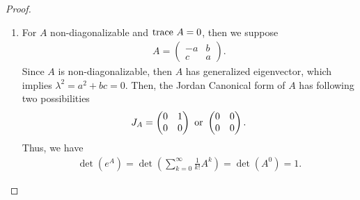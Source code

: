 \documentclass[11pt]{article}
\theoremstyle{definition}
\numberwithin{equation}{subsection}
\begin{document}
\begin{proof}
\begin{enumerate}[label=(\alph*)]
\begin{enumerate}[label = \arabic*)]
        \item For $A$ non-diagonalizable and ${\rm trace}\,\, A = 0$, then we suppose 
        \begin{align*}
            A = \begin{pmatrix}
                - a &  b \\
                c   &  a
            \end{pmatrix}. 
        \end{align*}
        Since $A$ is non-diagonalizable, then $A$ has generalized eigenvector, which implies $\lambda^2 = a^2 + bc = 0$. Then, the Jordan Canonical form of $A$ has following two possibilities
        \begin{align*}
            J_A = \begin{pmatrix}
                0 &  1 \\
                0   &  0
            \end{pmatrix}\,\, {\rm or} \,\, \begin{pmatrix}
                0 &  0 \\
                0   &  0
            \end{pmatrix}.
        \end{align*}
        Thus, we have 
        \begin{align*}
            \det \left(e^A\right) = \det \left( \sum^\infty_{k = 0} \frac{1}{k!} A^k \right) = \det \left(A^0\right) = 1.
        \end{align*}
    \end{enumerate}
\end{enumerate}
\end{proof}

\medskip
\end{document}
